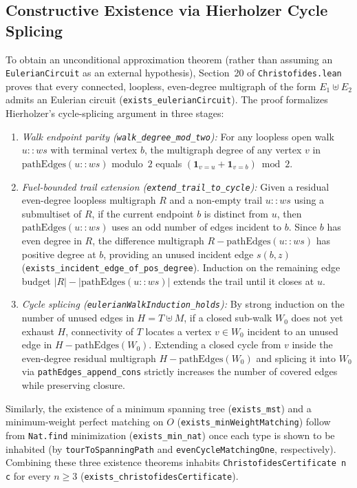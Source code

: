 \subsection{Constructive Existence via Hierholzer Cycle Splicing}

To obtain an unconditional approximation theorem (rather than assuming an \texttt{EulerianCircuit} as an external hypothesis), Section~20 of \texttt{Christofides.lean} proves that every connected, loopless, even-degree multigraph of the form $E_1 \uplus E_2$ admits an Eulerian circuit (\texttt{exists\_eulerianCircuit}). The proof formalizes Hierholzer's cycle-splicing argument in three stages:
\begin{enumerate}
  \item \emph{Walk endpoint parity (\texttt{walk\_degree\_mod\_two}):} For any loopless open walk $u :: ws$ with terminal vertex $b$, the multigraph degree of any vertex $v$ in $\mathrm{pathEdges}(u :: ws)$ modulo~$2$ equals $(\mathbf{1}_{v = u} + \mathbf{1}_{v = b}) \bmod 2$.
  \item \emph{Fuel-bounded trail extension (\texttt{extend\_trail\_to\_cycle}):} Given a residual even-degree loopless multigraph $R$ and a non-empty trail $u :: ws$ using a submultiset of $R$, if the current endpoint $b$ is distinct from $u$, then $\mathrm{pathEdges}(u :: ws)$ uses an odd number of edges incident to $b$. Since $b$ has even degree in $R$, the difference multigraph $R - \mathrm{pathEdges}(u :: ws)$ has positive degree at $b$, providing an unused incident edge $s(b, z)$ (\texttt{exists\_incident\_edge\_of\_pos\_degree}). Induction on the remaining edge budget $|R| - |\mathrm{pathEdges}(u :: ws)|$ extends the trail until it closes at $u$.
  \item \emph{Cycle splicing (\texttt{eulerianWalkInduction\_holds}):} By strong induction on the number of unused edges in $H = T \uplus M$, if a closed sub-walk $W_0$ does not yet exhaust $H$, connectivity of $T$ locates a vertex $v \in W_0$ incident to an unused edge in $H - \mathrm{pathEdges}(W_0)$. Extending a closed cycle from $v$ inside the even-degree residual multigraph $H - \mathrm{pathEdges}(W_0)$ and splicing it into $W_0$ via \texttt{pathEdges\_append\_cons} strictly increases the number of covered edges while preserving closure.
\end{enumerate}

Similarly, the existence of a minimum spanning tree (\texttt{exists\_mst}) and a minimum-weight perfect matching on $O$ (\texttt{exists\_minWeightMatching}) follow from \texttt{Nat.find} minimization (\texttt{exists\_min\_nat}) once each type is shown to be inhabited (by \texttt{tourToSpanningPath} and \texttt{evenCycleMatchingOne}, respectively). Combining these three existence theorems inhabits \texttt{ChristofidesCertificate n c} for every $n \ge 3$ (\texttt{exists\_christofidesCertificate}).

